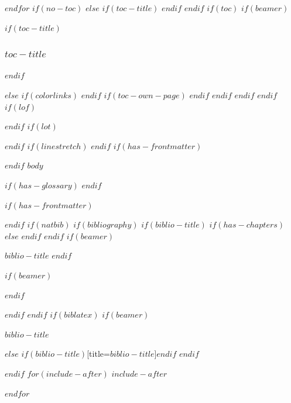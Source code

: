 \documentclass[
$if(fontsize)$
  $fontsize$,
$endif$
$if(papersize)$
  $papersize$paper,
$else$
  paper=a4,
$endif$
$if(beamer)$
  ignorenonframetext,
$if(handout)$
  handout,
$endif$
$if(aspectratio)$
  aspectratio=$aspectratio$,
$endif$
$endif$
$for(classoption)$
  $classoption$$sep$,
$endfor$
  ,captions=tableheading
]{$if(beamer)$$documentclass$$else$$if(book)$scrbook$else$scrartcl$endif$$endif$}
\newif\ifbibliography
\newcounter{none}
\theoremstyle{plain}
\theoremstyle{definition}
\theoremstyle{remark}
\renewcommand{\contentsname}{Inhaltsverzeichnis}%
\renewcommand{\contentsname}{Table of Contents}%
\providecommand{\mainmatter}{}
\providecommand{\backmatter}{}
\begin{document}
$endfor$
$if(no-toc)$
$else$
$if(toc-title)$
\renewcommand*\contentsname{$toc-title$}
$endif$
$endif$
$if(toc)$
$if(beamer)$
\begin{frame}[allowframebreaks]
$if(toc-title)$
  \frametitle{$toc-title$}
$endif$
  \tableofcontents[hideallsubsections]
\end{frame}
\newpage
$else$
{
$if(colorlinks)$
\hypersetup{linkcolor=$if(toccolor)$$toccolor$$else$$endif$}
$endif$
\setcounter{tocdepth}{$toc-depth$}
\tableofcontents
$if(toc-own-page)$
\newpage
$endif$
}
$endif$
$endif$
$endif$
$if(lof)$
\listoffigures
\newpage
$endif$
$if(lot)$
\listoftables
\newpage
$endif$
$if(linestretch)$
$endif$
$if(has-frontmatter)$
\mainmatter
$endif$
$body$


$if(has-glossary)$
\clearpage
\printglossary[type=\acronymtype, title={Abkürzungen}]
\printglossary[title={Glossar}]
$endif$


$if(has-frontmatter)$
\backmatter
$endif$
$if(natbib)$
$if(bibliography)$
$if(biblio-title)$
$if(has-chapters)$
\renewcommand\bibname{$biblio-title$}
$else$
\renewcommand\refname{$biblio-title$}
$endif$
$endif$
$if(beamer)$
\begin{frame}[allowframebreaks]{$biblio-title$}
  \bibliographytrue
$endif$
  
$if(beamer)$
\end{frame}
$endif$

$endif$
$endif$
$if(biblatex)$
$if(beamer)$
\begin{frame}[allowframebreaks]{$biblio-title$}
  \bibliographytrue
  \printbibliography[heading=none]
\end{frame}
$else$
\printbibliography$if(biblio-title)$[title=$biblio-title$]$endif$
$endif$

$endif$
$for(include-after)$
$include-after$

$endfor$
\end{document}
